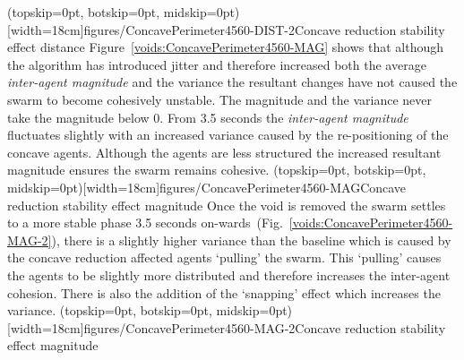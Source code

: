 \documentclass{ieeeaccess}
\begin{document}
\Figure[t!](topskip=0pt, botskip=0pt, midskip=0pt)[width=18cm]{figures/ConcavePerimeter4560-DIST-2}{Concave reduction stability effect distance\label{voids:ConcavePerimeter4560-DIST-2}}
Figure~\ref{voids:ConcavePerimeter4560-MAG} shows that although the algorithm has introduced jitter and therefore increased both the average \textit{inter-agent magnitude} and the variance the resultant changes have not caused the swarm to become cohesively unstable. The magnitude and the variance never take the magnitude below 0. From 3.5 seconds the \textit{inter-agent magnitude} fluctuates slightly with an increased variance caused by the re-positioning of the concave agents. Although the agents are less structured the increased resultant magnitude ensures the swarm remains cohesive. 
\Figure[t!](topskip=0pt, botskip=0pt, midskip=0pt)[width=18cm]{figures/ConcavePerimeter4560-MAG}{Concave reduction stability effect magnitude\label{voids:ConcavePerimeter4560-MAG}}
Once the void is removed the swarm settles to a more stable phase 3.5 seconds on-wards~(Fig.~\ref{voids:ConcavePerimeter4560-MAG-2}), there is a slightly higher variance than the baseline which is caused by the concave reduction affected agents `pulling' the swarm. This `pulling' causes the agents to be slightly more distributed and therefore increases the inter-agent cohesion. There is also the addition of the `snapping' effect which increases the variance. 
\Figure[t!](topskip=0pt, botskip=0pt, midskip=0pt)[width=18cm]{figures/ConcavePerimeter4560-MAG-2}{Concave reduction stability effect magnitude\label{voids:ConcavePerimeter4560-MAG-2}}
\end{document}

